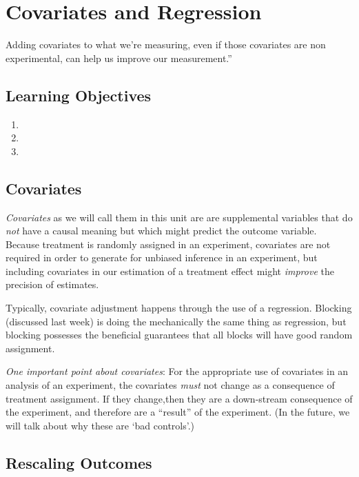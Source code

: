 \documentclass[
]{book}
\providecommand{\tightlist}{%
  \setlength{\itemsep}{0pt}\setlength{\parskip}{0pt}}
\begin{document}
\hypertarget{covariates-and-regression}{%
\chapter{Covariates and Regression}\label{covariates-and-regression}}

Adding covariates to what we're measuring, even if those covariates are
non experimental, can help us improve our measurement.''

\hypertarget{learning-objectives-4}{%
\section{Learning Objectives}\label{learning-objectives-4}}

\begin{enumerate}
\def\labelenumi{\arabic{enumi}.}
\tightlist
\item
\item
\item
\end{enumerate}

\hypertarget{covariates}{%
\section{Covariates}\label{covariates}}

\emph{Covariates} as we will call them in this unit are are supplemental
variables that do \emph{not} have a causal meaning but which might
predict the outcome variable. Because treatment is randomly assigned in
an experiment, covariates are not required in order to generate for
unbiased inference in an experiment, but including covariates in our
estimation of a treatment effect might \emph{improve} the precision of
estimates.

Typically, covariate adjustment happens through the use of a regression.
Blocking (discussed last week) is doing the mechanically the same thing
as regression, but blocking possesses the beneficial guarantees that all
blocks will have good random assignment.

\emph{One important point about covariates}: For the appropriate use of
covariates in an analysis of an experiment, the covariates \emph{must}
not change as a consequence of treatment assignment. If they change,then
they are a down-stream consequence of the experiment, and therefore are
a ``result'' of the experiment. (In the future, we will talk about why
these are `bad controls'.)

\hypertarget{rescaling-outcomes}{%
\section{Rescaling Outcomes}\label{rescaling-outcomes}}
\end{document}
